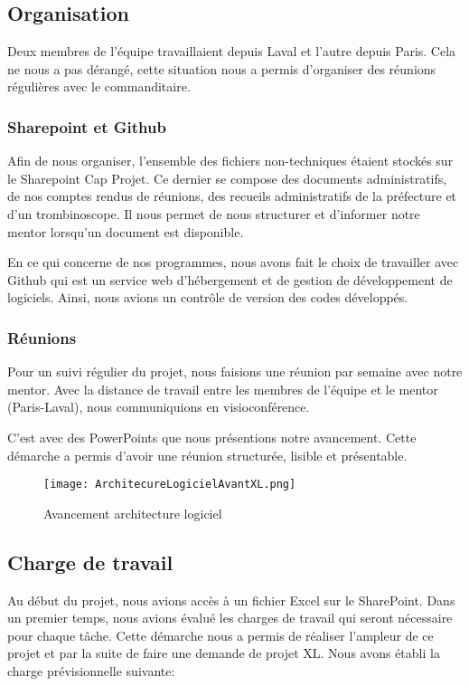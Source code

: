 \subsection{Organisation}
Deux membres de l'équipe travaillaient depuis Laval et l'autre depuis Paris.
Cela ne nous a pas dérangé, cette situation nous a permis d'organiser des réunions régulières avec le commanditaire. 

\subsubsection{Sharepoint et Github}
Afin de nous organiser, l'ensemble des fichiers non-techniques étaient stockés sur le Sharepoint Cap Projet.
Ce dernier se compose des documents administratifs, de nos comptes rendus de réunions, des recueils administratifs de la préfecture et d’un trombinoscope. 
Il nous permet de nous structurer et d’informer notre mentor lorsqu'un document est disponible. 

En ce qui concerne de nos programmes, nous avons fait le choix de travailler avec Github qui est un service web d'hébergement et de gestion de développement de logiciels.
Ainsi, nous avions un contrôle de version des codes développés. 


\subsubsection{Réunions}
Pour un suivi régulier du projet, nous faisions une réunion par semaine avec notre mentor.
Avec la distance de travail entre les membres de l'équipe et le mentor (Paris-Laval), nous communiquions en visioconférence. 

C’est avec des PowerPoints que nous présentions notre avancement.
Cette démarche a permis d'avoir une réunion structurée, lisible et présentable. 

\begin{figure}[h!]
  \centering
  \texttt{[image: ArchitecureLogicielAvantXL.png]}
	\caption[]{Avancement architecture logiciel}
	\label{}
\end{figure}




\subsection{Charge de travail}
Au début du projet, nous avions accès à un fichier Excel sur le SharePoint.
Dans un premier temps, nous avions évalué les charges de travail qui seront nécessaire pour chaque tâche.
Cette démarche nous a permis de réaliser l'ampleur de ce projet et par la suite de faire une demande de projet XL\@. 
Nous avons établi la charge prévisionnelle suivante:

